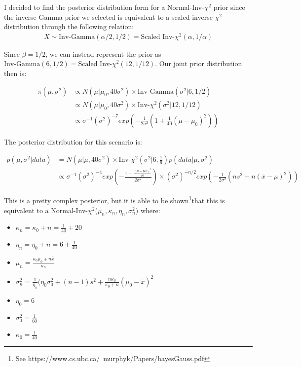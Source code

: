 \documentclass[12pt,a4paper]{article}
\begin{document}
I decided to find the posterior distribution form for a Normal-Inv-$\chi^2$ prior since the inverse Gamma prior we selected is equivalent to a scaled inverse $\chi^2$ distribution through the following relation:
\begin{align*}
	X \sim \text{Inv-Gamma}(\alpha/2, 1/2) = \text{Scaled Inv-}\chi^2(\alpha, 1/\alpha)
\end{align*}

Since $\beta = 1/2$, we can instead represent the prior as $\text{Inv-Gamma}(6, 1/2) = \text{Scaled Inv-}\chi^2(12, 1/12)$.
Our joint prior distribution then is:

\begin{align*}
	\pi(\mu, \sigma^2) &\propto N(\mu | \mu_0, 40\sigma^2) \times \text{Inv-Gamma}(\sigma^2 | 6, 1/2) \\
					   &\propto N(\mu | \mu_0, 40\sigma^2) \times \text{Inv-}\chi^2(\sigma^2 | 12, 1/12) \\
					   &\propto \sigma^{-1} (\sigma^2)^{-7} exp\left(-\frac{1}{2\sigma^2} \left( 1 + \frac{1}{40}(\mu - \mu_0)^2\right)\right)
\end{align*}

The posterior distribution for this scenario is:

\begin{align*}
	p(\mu, \sigma^2 | data) &= N(\mu | \mu, 40 \sigma^2) \times \text{Inv-}\chi^2(\sigma^2 | 6, \frac{1}{6}) p(data | \mu, \sigma^2) \\
							&\propto \sigma^{-1} (\sigma^2)^{-4} exp \left(- \frac{1 + \frac{(\mu - 60)^2}{40}}{2\sigma^2}\right) \times (\sigma^2)^{-n/2} exp\left(- \frac{1}{2\sigma^2} \left(ns^2 + n(\bar{x} - \mu)^2\right)\right)
\end{align*}

This is a pretty complex posterior, but it is able to be shown\footnote{See https://www.cs.ubc.ca/~murphyk/Papers/bayesGauss.pdf}that this is equivalent to a Normal-Inv-$\chi^2$($\mu_n, \kappa_n, \eta_n, \sigma^2_n)$ where:

\begin{itemize}
	\item $\kappa_n = \kappa_0 + n = \frac{1}{40} + 20$
	\item $\eta_n = \eta_0 + n = 6 + \frac{1}{40}$
	\item $\mu_n = \frac{\kappa_0 \mu_0 + n \bar{x}}{\kappa_n}$
	\item $\sigma^2_n = \frac{1}{\eta_n}(\eta_0 \sigma^2_0 + (n-1)s^2 + \frac{n\kappa_0}{\kappa_0 + n} (\mu_0 - \bar{x})^2$
	\item $\eta_0 = 6$
	\item $\sigma^2_0 = \frac{1}{60}$
	\item $\kappa_0 = \frac{1}{40}$
\end{itemize}
\end{document}
